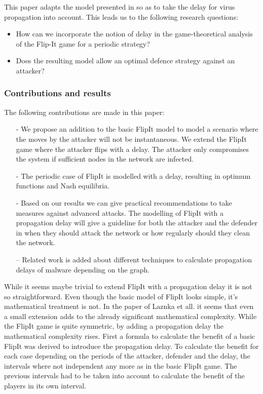 This paper adapts the model presented in \cite{FlipIt} so as to take the delay for virus propagation into account.
This leads us to the following research questions:
\begin{itemize}
\item How can we incorporate the notion of delay in the game-theoretical analysis of the Flip-It game for a periodic strategy?
\item Does the resulting model allow an optimal defence strategy against an attacker? 
\end{itemize}

\subsubsection{Contributions and results}
The following contributions are made in this paper:
\begin{itemize}
\item[-] We propose an addition to the basic FlipIt model to model a scenario where the moves by the attacker will not be instantaneous. We extend the FlipIt game where the attacker flips with a delay. The attacker only compromises the system if sufficient nodes in the network are infected. 
\item[-] The periodic case of FlipIt is modelled with a delay, resulting in optimum functions and Nash equilibria. 
\item[-] Based on our results we can give practical recommendations to take measures against advanced attacks.  The modelling of FlipIt with a propagation delay will give a guideline for both the attacker and the defender in when they should attack the network or how regularly should they clean the network.
\item[--] Related work is added about different techniques to calculate propagation delays of malware depending on the graph. 
\end{itemize}


While it seems maybe trivial to extend FlipIt with a propagation delay it is not so straightforward. Even though the basic model of FlipIt looks simple, it's mathematical treatment is not. In the paper of Laznka et all. \citep{FlipThem} it seems that even a small extension adds to the already significant mathematical complexity. While the FlipIt game is quite symmetric, by adding a propagation delay the mathematical complexity rises. First a formula to calculate the benefit of a basic FlipIt was derived to introduce the propagation delay. To calculate the benefit for each case depending on the periods of the attacker, defender and the delay, the intervals where not independent any more as in the basic FlipIt game. The previous intervals had to be taken into account to calculate the benefit of the players in its own interval. 

